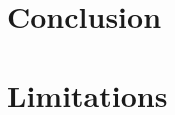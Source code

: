 \documentclass[11pt]{article}
\begin{document}
\section{Conclusion}
\label{sec:conclusion}


\section*{Limitations}





\appendix

\end{document}
